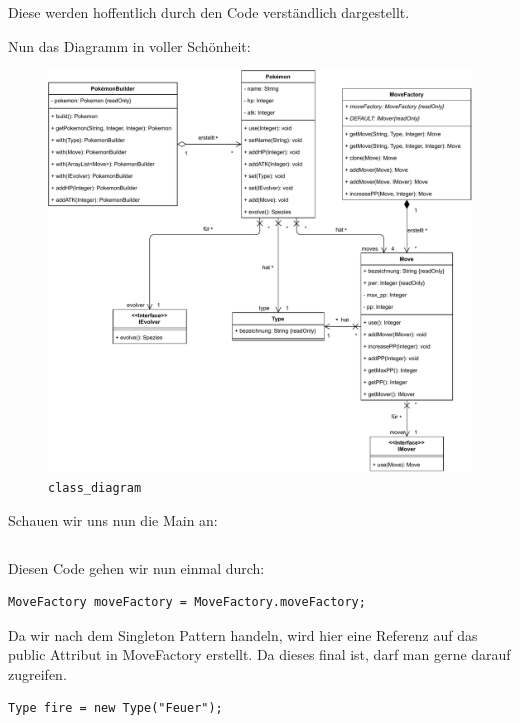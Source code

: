 \documentclass{article}
\begin{document}
\begin{enumerate}[label=\alph*.]
            Diese werden hoffentlich durch den Code verständlich dargestellt.

            \newpage
            Nun das Diagramm in voller Schönheit:
            \begin{figure}[ht]
                \includegraphics[width=\textwidth]{swt_wende_tim_h09_class_diagram.pdf}
                \caption{\texttt{class\_diagram}}
            \end{figure}

            \newpage
            Schauen wir uns nun die Main an:

            \inputminted{java}{Test.java}

            \newpage Diesen Code gehen wir nun einmal durch:

            \begin{verbatim}
MoveFactory moveFactory = MoveFactory.moveFactory;
            \end{verbatim}

            Da wir nach dem Singleton Pattern handeln, wird hier eine Referenz auf das public Attribut in MoveFactory erstellt.
            Da dieses final ist, darf man gerne darauf zugreifen.\\

            \begin{verbatim}
Type fire = new Type("Feuer");
            \end{verbatim}


\end{enumerate}
\end{document}
